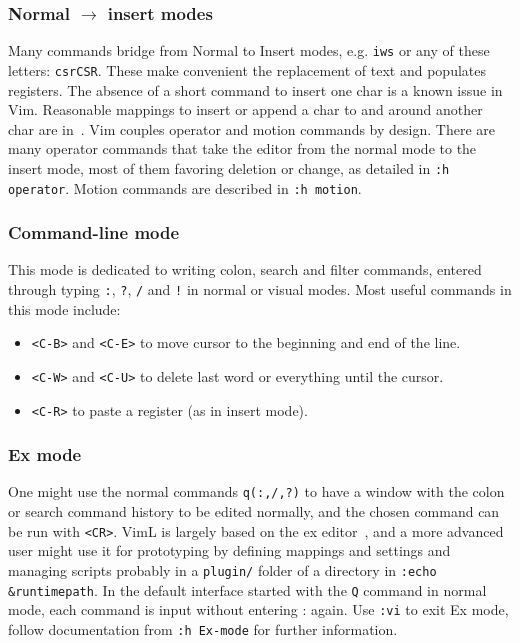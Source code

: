 \documentclass{article}
\newcommand{\ttt}[1] {
	\texttt{<#1>}}
\newcommand{\tttt}[1]{\texttt{#1}}
\begin{document}
\subsubsection{Normal $\rightarrow$ insert modes}\label{navIn}
Many commands bridge from Normal to Insert modes,
e.g. \tttt{iws} or any of these letters: \tttt{csrCSR}.
These make convenient the replacement of text and populates registers.
The absence of a short command to insert one char is
a known issue in Vim.
Reasonable mappings to insert or append a char to and around
another char are in~\cite{vimrc}.
Vim couples operator and motion commands by design.
There are many operator commands that take the editor from
the normal mode to the insert mode, most of them
favoring deletion or change, as detailed in \tttt{:h operator}.
Motion commands are described in \tttt{:h motion}.

\subsubsection{Command-line mode}\label{sec:com}
This mode is dedicated to writing colon, search and filter commands,
entered through typing \tttt{:}, \tttt{?}, \tttt{/} and \tttt{!} in normal or visual modes.
Most useful commands in this mode include:
\begin{itemize}
  \item \ttt{C-B} and \ttt{C-E} to move cursor to the beginning and
    end of the line.
  \item \ttt{C-W} and \ttt{C-U} to delete last word or everything
    until the cursor.
  \item \ttt{C-R} to paste a register (as in insert mode).
\end{itemize}

\subsubsection{Ex mode}\label{sec:ex}
One might use the normal commands \tttt{q(:,/,?)} to have a window
with the colon or search command history to be edited normally,
and the chosen command can be run with \ttt{CR}.
VimL is largely based on the ex editor~\cite{ex},
and a more advanced user might use it for prototyping
by defining mappings and settings and managing scripts
probably in a \tttt{plugin/} folder of a directory in \tttt{:echo \&runtimepath}.
In the default interface started with the \tttt{Q} command in normal mode,
each command is input without entering : again. Use \tttt{:vi} to exit Ex mode,
follow documentation from \tttt{:h Ex-mode} for further information.
\end{document}
